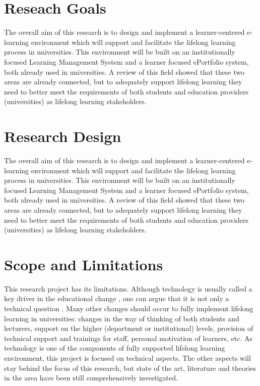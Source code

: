 \section{Reseach Goals}

The overall aim of this research is to design and implement a learner-centered e-learning
environment which will support and facilitate the lifelong learning process in universities.
This environment will be built on an institutionally focused Learning Management
System and a learner focused ePortfolio system, both already used in universities. A
review of this field showed that these two areas are already connected, but to adequately
support lifelong learning they need to better meet the requirements of both students and
education providers (universities) as lifelong learning stakeholders.

\section{Research Design}

The overall aim of this research is to design and implement a learner-centered e-learning
environment which will support and facilitate the lifelong learning process in universities.
This environment will be built on an institutionally focused Learning Management
System and a learner focused ePortfolio system, both already used in universities. A
review of this field showed that these two areas are already connected, but to adequately
support lifelong learning they need to better meet the requirements of both students and
education providers (universities) as lifelong learning stakeholders.

\section{Scope and Limitations}

This research project has its limitations. Although technology is usually called
a key driver in the educational change \citep{Attwell2007}, one can argue that
it is not only a technical question \citep{Schaffert2008}. Many other changes
should occur to fully implement lifelong learning in universities: changes in
the way of thinking of both students and lecturers, support on the higher
(department or institutional) levels, provision of technical support and
trainings for staff, personal motivation of learners, etc. As technology is one
of the components of fully supported lifelong learning environment, this project
is focused on technical aspects. The other aspects will stay behind the focus of
this research, but state of the art, literature and theories in the area have
been still comprehensively investigated.

